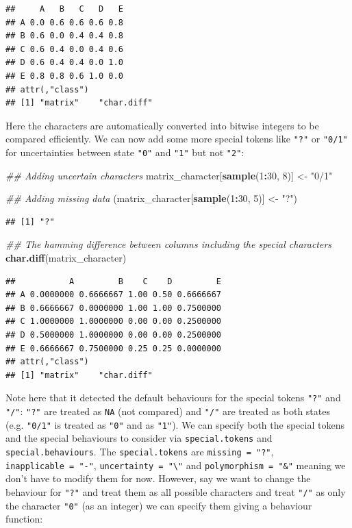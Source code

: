\documentclass[]{book}
\newenvironment{Shaded}{\begin{snugshade}}{\end{snugshade}}
\newcommand{\CommentTok}[1]{\textcolor[rgb]{0.56,0.35,0.01}{\textit{#1}}}
\newcommand{\DecValTok}[1]{\textcolor[rgb]{0.00,0.00,0.81}{#1}}
\newcommand{\KeywordTok}[1]{\textcolor[rgb]{0.13,0.29,0.53}{\textbf{#1}}}
\newcommand{\NormalTok}[1]{#1}
\newcommand{\OperatorTok}[1]{\textcolor[rgb]{0.81,0.36,0.00}{\textbf{#1}}}
\newcommand{\StringTok}[1]{\textcolor[rgb]{0.31,0.60,0.02}{#1}}
\begin{document}
\begin{verbatim}
##     A   B   C   D   E
## A 0.0 0.6 0.6 0.6 0.8
## B 0.6 0.0 0.4 0.4 0.8
## C 0.6 0.4 0.0 0.4 0.6
## D 0.6 0.4 0.4 0.0 1.0
## E 0.8 0.8 0.6 1.0 0.0
## attr(,"class")
## [1] "matrix"    "char.diff"
\end{verbatim}

Here the characters are automatically converted into bitwise integers to be compared efficiently. We can now add some more special tokens like \texttt{"?"} or \texttt{"0/1"} for uncertainties between state \texttt{"0"} and \texttt{"1"} but not \texttt{"2"}:

\begin{Shaded}
\begin{Highlighting}[]
\CommentTok{## Adding uncertain characters}
\NormalTok{matrix_character[}\KeywordTok{sample}\NormalTok{(}\DecValTok{1}\OperatorTok{:}\DecValTok{30}\NormalTok{, }\DecValTok{8}\NormalTok{)] <-}\StringTok{ "0/1"}

\CommentTok{## Adding missing data}
\NormalTok{(matrix_character[}\KeywordTok{sample}\NormalTok{(}\DecValTok{1}\OperatorTok{:}\DecValTok{30}\NormalTok{, }\DecValTok{5}\NormalTok{)] <-}\StringTok{ "?"}\NormalTok{)}
\end{Highlighting}
\end{Shaded}

\begin{verbatim}
## [1] "?"
\end{verbatim}

\begin{Shaded}
\begin{Highlighting}[]
\CommentTok{## The hamming difference between columns including the special characters}
\KeywordTok{char.diff}\NormalTok{(matrix_character)}
\end{Highlighting}
\end{Shaded}

\begin{verbatim}
##           A         B    C    D         E
## A 0.0000000 0.6666667 1.00 0.50 0.6666667
## B 0.6666667 0.0000000 1.00 1.00 0.7500000
## C 1.0000000 1.0000000 0.00 0.00 0.2500000
## D 0.5000000 1.0000000 0.00 0.00 0.2500000
## E 0.6666667 0.7500000 0.25 0.25 0.0000000
## attr(,"class")
## [1] "matrix"    "char.diff"
\end{verbatim}

Note here that it detected the default behaviours for the special tokens \texttt{"?"} and \texttt{"/"}: \texttt{"?"} are treated as \texttt{NA} (not compared) and \texttt{"/"} are treated as both states (e.g. \texttt{"0/1"} is treated as \texttt{"0"} and as \texttt{"1"}).
We can specify both the special tokens and the special behaviours to consider via \texttt{special.tokens} and \texttt{special.behaviours}.
The \texttt{special.tokens} are \texttt{missing\ =\ "?"}, \texttt{inapplicable\ =\ "-"}, \texttt{uncertainty\ =\ "\textbackslash{}"} and \texttt{polymorphism\ =\ "\&"} meaning we don't have to modify them for now.
However, say we want to change the behaviour for \texttt{"?"} and treat them as all possible characters and treat \texttt{"/"} as only the character \texttt{"0"} (as an integer) we can specify them giving a behaviour function:
\end{document}

